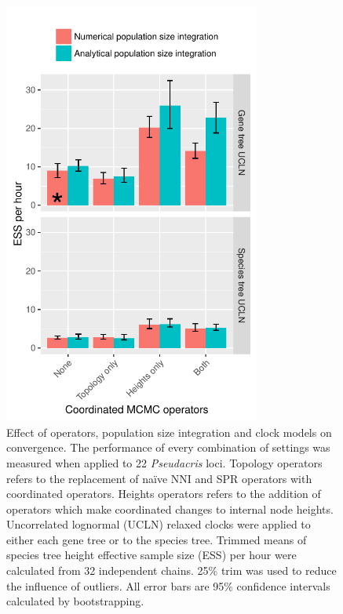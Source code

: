 \documentclass[12pt]{article}
\begin{document}
\begin{figure}[htb!]
\centering
\includegraphics[height=14cm]{speciesTreeHeight_ess_per_hour.pdf}
\caption
{Effect of operators, population size integration and clock models on
convergence. The performance of every combination of settings was measured when
applied to 22 \textit{Pseudacris} loci. Topology operators refers to the
replacement of na\"ive NNI and SPR operators with coordinated operators. Heights
operators refers to the addition of operators which make coordinated changes to
internal node heights. Uncorrelated lognormal (UCLN) relaxed clocks were applied
to either each gene tree or to the species tree. Trimmed means of species tree
height effective sample size (ESS) per hour were calculated from 32 independent
chains. 25\% trim was used to reduce the influence of outliers. All error bars
are 95\% confidence intervals calculated by bootstrapping.}
\label{fig:realEssPerHour}
\end{figure}
\end{document}
